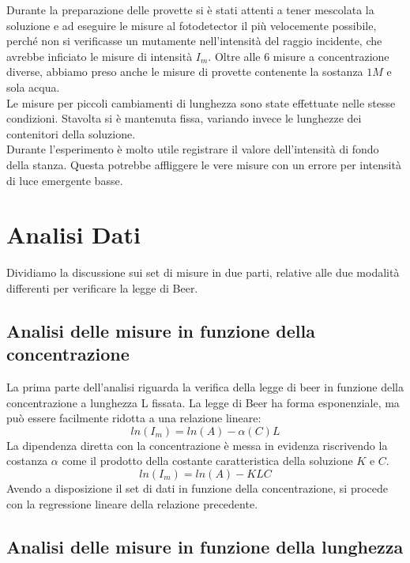 \documentclass[letterpaper,11pt]{article}
\begin{document}
\begin{body}
Durante la preparazione delle provette si è stati attenti a tener mescolata la soluzione e ad eseguire le misure al fotodetector il più velocemente possibile, perché non si verificasse un mutamente nell'intensità del raggio incidente, che avrebbe inficiato le misure di intensità $I_m$. Oltre alle $6$ misure a concentrazione diverse, abbiamo preso anche le misure di provette contenente la sostanza $1M$ e sola acqua. \\
Le misure per piccoli cambiamenti di lunghezza sono state effettuate nelle stesse condizioni. Stavolta si è mantenuta fissa, variando invece le lunghezze dei contenitori della soluzione.\\
Durante l'esperimento è molto utile registrare il valore dell'intensità di fondo della stanza. Questa potrebbe affliggere le vere misure con un errore per intensità di luce emergente basse.  

\section{Analisi Dati}
Dividiamo la discussione sui set di misure in due parti, relative alle due modalità differenti per verificare la legge di Beer. 
\subsection{Analisi delle misure in funzione della concentrazione}
La prima parte dell'analisi riguarda la verifica della legge di beer in funzione della concentrazione a lunghezza L fissata. La legge di Beer ha forma esponenziale, ma può essere facilmente ridotta a una relazione lineare: 
\begin{equation}
ln(I_m) = ln(A) - \alpha(C) L
\end{equation}
La dipendenza diretta con la concentrazione è messa in evidenza riscrivendo la costanza $\alpha$ come il prodotto della costante caratteristica della soluzione $K$ e $C$.
\begin{equation}
ln(I_m) = ln(A) - K L C
\end{equation}
Avendo a disposizione il set di dati in funzione della concentrazione, si procede con la regressione lineare della relazione precedente.   





\subsection{Analisi delle misure in funzione della lunghezza}








\end{body}
\end{document}
